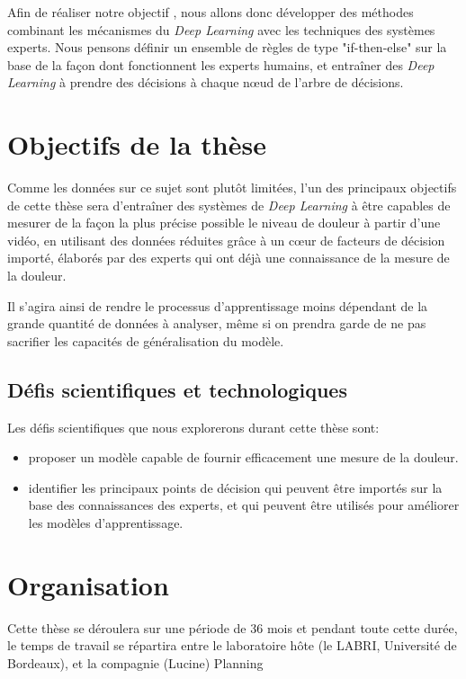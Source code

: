 \documentclass[french]{article}
\begin{document}
Afin de réaliser notre objectif , nous allons donc développer des méthodes
combinant les mécanismes du \emph{Deep Learning} avec les techniques des systèmes
experts. Nous pensons définir un ensemble de règles de type "if-then-else" sur
la base de la façon dont fonctionnent les experts humains, et entraîner des
\emph{Deep Learning} à prendre des décisions à chaque nœud de l’arbre de décisions.


\section{Objectifs de la thèse}
\label{sec:orgf2f9c8d}

Comme les données sur ce sujet sont plutôt limitées, l’un des principaux
objectifs de cette thèse sera d’entraîner des systèmes de \emph{Deep Learning} à être
capables de mesurer de la façon la plus précise possible le niveau de douleur
à partir d'une vidéo, en utilisant des données réduites grâce à un cœur de facteurs de
décision importé, élaborés par des experts qui ont déjà une connaissance de la
mesure de la douleur.  

Il s’agira ainsi de rendre le processus d’apprentissage moins dépendant de la
grande quantité de données à analyser, même si on prendra garde de ne pas
sacrifier les capacités de généralisation du modèle.  


\subsection{Défis scientifiques et technologiques}
\label{sec:orgb1aac1c}


Les défis scientifiques que nous explorerons durant cette thèse sont:
\begin{itemize}
\item proposer un modèle capable de fournir efficacement une mesure de la douleur.
\item identifier les principaux points de décision qui peuvent être importés sur la
base des connaissances des experts, et qui peuvent être utilisés pour
améliorer les modèles d’apprentissage.
\end{itemize}

\section{Organisation}
\label{sec:org66b1492}
Cette thèse se déroulera sur une période de 36 mois et pendant toute cette
durée, le temps de travail se répartira entre le laboratoire hôte (le LABRI,
Université de Bordeaux), et la compagnie (Lucine) Planning
\end{document}
